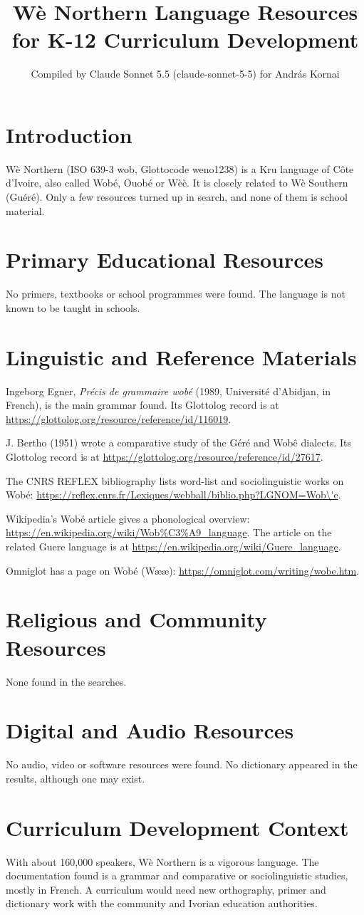 \documentclass[12pt]{article}
\title{W\`e Northern Language Resources for K-12 Curriculum Development}
\author{Compiled by Claude Sonnet 5.5 (claude-sonnet-5-5) for Andr\'as Kornai}
\date{}
\begin{document}
\maketitle

\section{Introduction}
W\`e Northern (ISO 639-3 wob, Glottocode weno1238) is a Kru language of C\^ote d'Ivoire, also called Wob\'e, Ouob\'e or W\`e\`e. It is closely related to W\`e Southern (Gu\'er\'e). Only a few resources turned up in search, and none of them is school material.

\section{Primary Educational Resources}
No primers, textbooks or school programmes were found. The language is not known to be taught in schools.

\section{Linguistic and Reference Materials}
Ingeborg Egner, \emph{Pr\'ecis de grammaire wob\'e} (1989, Universit\'e d'Abidjan, in French), is the main grammar found. Its Glottolog record is at \url{https://glottolog.org/resource/reference/id/116019}.

J. Bertho (1951) wrote a comparative study of the G\'er\'e and Wob\^e dialects. Its Glottolog record is at \url{https://glottolog.org/resource/reference/id/27617}.

The CNRS REFLEX bibliography lists word-list and sociolinguistic works on Wob\'e: \url{https://reflex.cnrs.fr/Lexiques/webball/biblio.php?LGNOM=Wob\'e}.

Wikipedia's Wob\'e article gives a phonological overview: \url{https://en.wikipedia.org/wiki/Wob%C3%A9_language}. The article on the related Guere language is at \url{https://en.wikipedia.org/wiki/Guere_language}.

Omniglot has a page on Wob\'e (W\ae\ae): \url{https://omniglot.com/writing/wobe.htm}.

\section{Religious and Community Resources}
None found in the searches.

\section{Digital and Audio Resources}
No audio, video or software resources were found. No dictionary appeared in the results, although one may exist.

\section{Curriculum Development Context}
With about 160{,}000 speakers, W\`e Northern is a vigorous language. The documentation found is a grammar and comparative or sociolinguistic studies, mostly in French. A curriculum would need new orthography, primer and dictionary work with the community and Ivorian education authorities.
\end{document}
